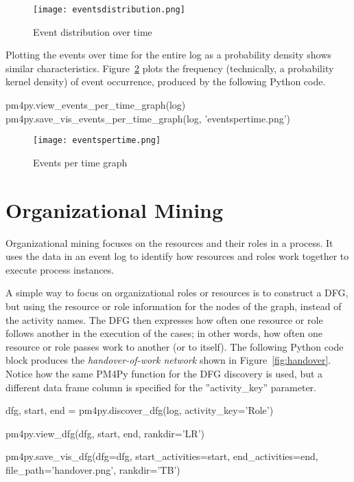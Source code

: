 \begin{figure}
\centering
\texttt{[image: eventsdistribution.png]}
\caption{Event distribution over time}
\label{fig:event_distribution}
\end{figure}

Plotting the events over time for the entire log as a probability density shows similar characteristics. Figure~\ref{fig:events_per_time} plots the frequency (technically, a probability kernel density) of event occurrence, produced by the following Python code.

\begin{pythoncode}
pm4py.view_events_per_time_graph(log)
pm4py.save_vis_events_per_time_graph(log, 'eventspertime.png')
\end{pythoncode}

\begin{figure}
\centering
\texttt{[image: eventspertime.png]}
\caption{Events per time graph}
\label{fig:events_per_time}
\end{figure}

\FloatBarrier
\section{Organizational Mining}

Organizational mining focuses on the resources and their roles in a process. It uses the data in an event log to identify how resources and roles work together to execute process instances. 

A simple way to focus on organizational roles or resources is to construct a DFG, but using the resource or role information for the nodes of the graph, instead of the activity names. The DFG then expresses how often one resource or role follows another in the execution of the cases; in other words, how often one resource or role passes work to another (or to itself). The following Python code block produces the \emph{handover-of-work network} shown in Figure~\ref{fig:handover}. Notice how the same PM4Py function for the DFG discovery is used, but a different data frame column is specified for the ''activity\_key'' parameter.

\begin{pythoncode}
dfg, start, end = pm4py.discover_dfg(log, activity_key='Role')

pm4py.view_dfg(dfg, start, end, rankdir='LR')

pm4py.save_vis_dfg(dfg=dfg,
    start_activities=start, 
    end_activities=end, 
    file_path='handover.png', rankdir='TB')
\end{pythoncode}

